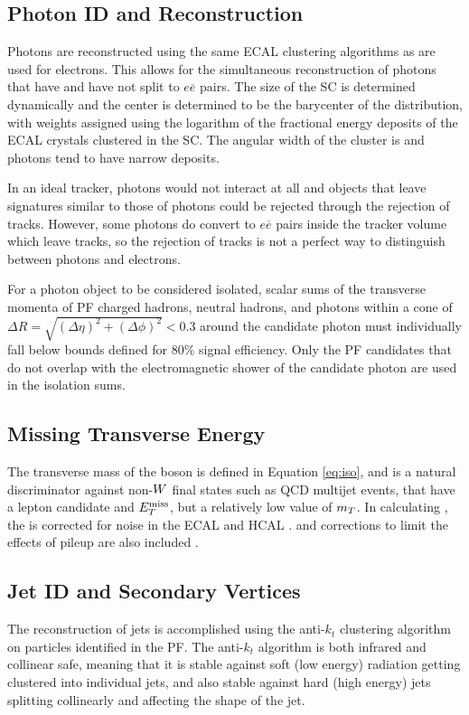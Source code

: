 \subsection{Photon ID and Reconstruction}\label{sec:photonreco}

 Photons are reconstructed using the same ECAL
  clustering algorithms as are used for electrons.
 This allows for
  the simultaneous reconstruction of
  photons that have and have not split to $e\overline{e}$
  pairs.
 The size of the SC is determined dynamically
  and the center is determined to be the barycenter
  of the distribution, with weights assigned
  using the logarithm of the fractional energy deposits
  of the ECAL crystals clustered in the SC.
 The angular width of the cluster is \sieie 
  and photons tend to have narrow deposits.

 In an ideal tracker, photons would not interact 
  at all and objects that leave signatures
  similar to those of photons could be rejected
  through the rejection of tracks.
 However, some photons do convert to $e\overline{e}$
  pairs inside the tracker volume which leave tracks,
  so the rejection of tracks is not a perfect way 
  to distinguish between photons and electrons.

 For a photon object to be considered isolated,
  scalar sums of the transverse momenta of PF charged hadrons, neutral
  hadrons, and photons within a cone of $\Delta R = \sqrt{(\Delta
   \eta)^2 + (\Delta \phi)^2} < 0.3$ around the candidate photon must
  individually fall below bounds defined for 80\% signal
  efficiency.
 Only the PF candidates that do not overlap with the
  electromagnetic shower of the candidate photon are used in the
  isolation sums.

\subsection{Missing Transverse Energy}

The transverse mass of the \w boson
 is defined in Equation \ref{eq:iso},
 and is a  natural discriminator against non-$W$ final states
 such as QCD multijet events,
 that have a lepton candidate and $E_T^{\mathrm{miss}}$,
 but a relatively low value of $m_T$.
In calculating \mt, the \met is corrected for noise in the
 ECAL and HCAL \cite{WZCMS:2010}.
 and corrections to limit the effects of
 pileup are also included \cite{CMS:8TeVMET}.

\subsection{Jet ID and Secondary Vertices}\label{sec:jetsvreco}
 The reconstruction
  of jets is accomplished using the anti-$k_t$
  clustering algorithm on particles identified
  in the PF.
 The anti-$k_t$ algorithm is both infrared and collinear
  safe, meaning that it is stable against
  soft (low energy) radiation getting clustered into individual jets, and
  also stable against hard (high energy) jets splitting
  collinearly and affecting the shape of the jet.

